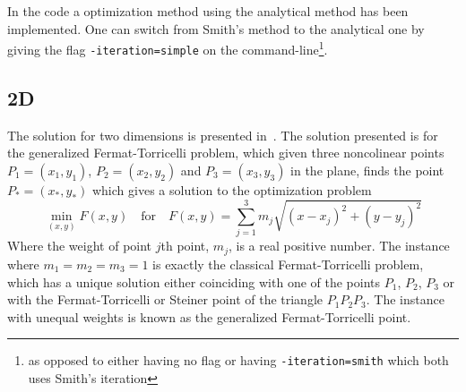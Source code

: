 In the code a optimization method using the analytical method has been
implemented. One can switch from Smith's method to the analytical one by giving
the flag \texttt{-iteration=simple} on the command-line\footnote{as opposed to
  either having no flag or having \texttt{-iteration=smith} which both uses
  Smith's iteration}.

\subsection{2D}
\label{sec:2d}

The solution for two dimensions is presented in~\cite{uteshev2014}. The solution
presented is for the generalized Fermat-Torricelli problem, which given three
noncolinear points $P_1 = (x_1, y_1)$, $P_2 = (x_2, y_2)$ and $P_3 = (x_3, y_3)$
in the plane, finds the point $P_\ast = (x_\ast, y_\ast)$ which gives a solution
to the optimization problem
%
\begin{equation}
  \min_{(x,y)} F(x,y) \quad \text{for} \quad F(x,y) = \sum_{j=1}^3 m_j
  \sqrt{{(x-x_j)}^2 + {(y-y_j)}^2}
\end{equation}
%
Where the weight of point $j$th point, $m_j$, is a real positive number. The
instance where $m_1 = m_2 = m_3 = 1$ is exactly the classical Fermat-Torricelli
problem, which has a unique solution either coinciding with one of the points
$P_1$, $P_2$, $P_3$ or with the Fermat-Torricelli or Steiner point of the
triangle $P_1 P_2 P_3$. The instance with unequal weights is known as the
generalized Fermat-Torricelli point.

